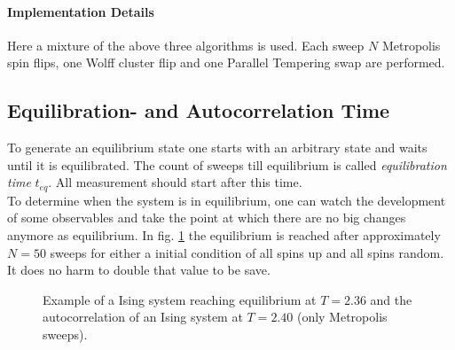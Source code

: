     \paragraph{Implementation Details}
        Here a mixture of the above three algorithms is used.
        Each sweep \(N\) Metropolis spin flips, one Wolff cluster flip
        and one Parallel Tempering swap are performed.

\subsection{Equilibration- and Autocorrelation Time}
    To generate an equilibrium state one starts with an arbitrary state
    and waits until it is equilibrated. The count of sweeps till
    equilibrium is called \emph{equilibration time} \(t_{eq}\).
    All measurement should start after this time.\\
    To determine when the system is in equilibrium, one can watch the
    development of some observables and take the point at which there
    are no big changes anymore as equilibrium. In fig.
    \ref{fig:equiandauto}
    the equilibrium is reached after approximately \(N=50\) sweeps for
    either a initial condition of all spins up and all spins random. It
    does no harm to double that value to be save.
    \begin{figure}[htbp]
        \centering
        \caption[Examples for equilibration and autocorrelation]
                { Example of a Ising
                    system reaching equilibrium at \(T=2.36\) and
                  the
                    autocorrelation of an Ising system at \(T=2.40\)
                    (only Metropolis sweeps).
                }
        \label{fig:equiandauto}
    \end{figure}

